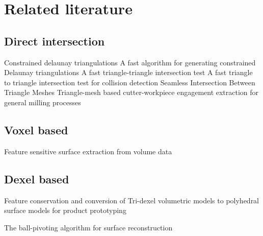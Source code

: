 
\chapter{Related literature}


\section{Direct intersection}

Constrained delaunay triangulations \cite{CDT}
A fast algorithm for generating constrained Delaunay triangulations \cite{CDT_fast}
A fast triangle-triangle intersection test \cite{tri_tri_intersection_moller}
A fast triangle to triangle intersection test for collision detection \cite{tri_tri_intersection_2}
Seamless Intersection Between Triangle Meshes \cite{mesh_intersection}
Triangle-mesh based cutter-workpiece engagement extraction for general milling processes \cite{cutter_workpiece_engagement}


\section{Voxel based}

Feature sensitive surface extraction from volume data \cite{extended_marching_cubes}


\section{Dexel based}

Feature conservation and conversion of Tri-dexel volumetric models to polyhedral surface models for product prototyping \cite{tridexel}

The ball-pivoting algorithm for surface reconstruction \cite{BPA}
